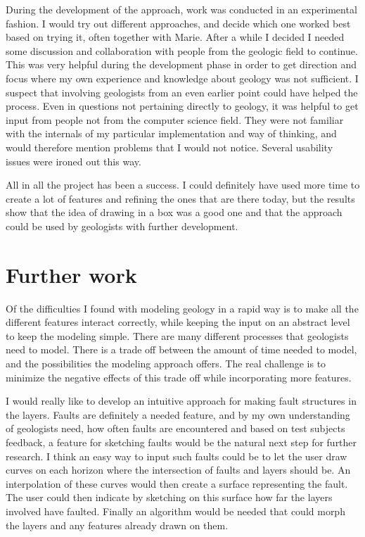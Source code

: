 \documentclass[a4paper,12pt]{report}
\begin{document}
During the development of the approach, work was conducted in an experimental fashion. I would try out different approaches, and decide which one worked best based on trying it, often together with Marie. After a while I decided I needed some discussion and collaboration with people from the geologic field to continue. This was very helpful during the development phase in order to get direction and focus where my own experience and knowledge about geology was not sufficient. I suspect that involving geologists from an even earlier point could have helped the process. Even in questions not pertaining directly to geology, it was helpful to get input from people not from the computer science field. They were not familiar with the internals of my particular implementation and way of thinking, and would therefore mention problems that I would not notice. Several usability issues were ironed out this way.

All in all the project has been a success. I could definitely have used more time to create a lot of features and refining the ones that are there today, but the results show that the idea of drawing in a box was a good one and that the approach could be used by geologists with further development.




\clearpage
\chapter{Further work}
\label{sec:further}

Of the difficulties I found with modeling geology in a rapid way is to make all the different features interact correctly, while keeping the input on an abstract level to keep the modeling simple. There are many different processes that geologists need to model. There is a trade off between the amount of time needed to model, and the possibilities the modeling approach offers. The real challenge is to minimize the negative effects of this trade off while incorporating more features.

I would really like to develop an intuitive approach for making fault structures in the layers. Faults are definitely a needed feature, and by my own understanding of geologists need, how often faults are encountered and based on test subjects feedback, a feature for sketching faults would be the natural next step for further research. I think an easy way to input such faults could be to let the user draw curves on each horizon where the intersection of faults and layers should be. An interpolation of these curves would then create a surface representing the fault. The user could then indicate by sketching on this surface how far the layers involved have faulted. Finally an algorithm would be needed that could morph the layers and any features already drawn on them.
\end{document}
